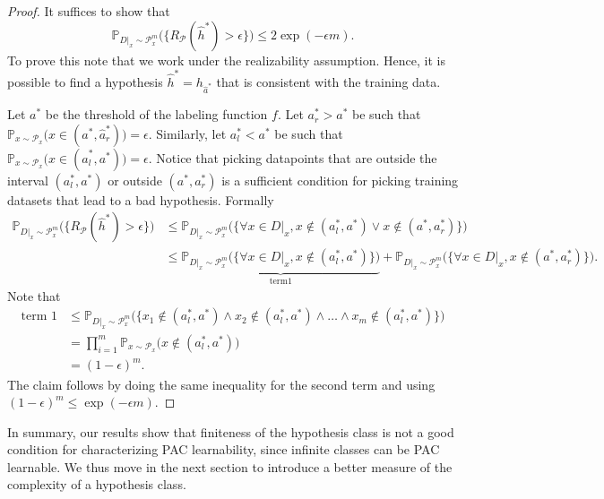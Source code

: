 \begin{proof}
	It suffices to show that 
	$$
	\mathbb{P}_{D|_x \sim \mathcal{P}^m_x} \bigl( \{ R_\mathcal{P}(\hat{h}^*) > \epsilon \}\bigr) \leq 2 \exp(-\epsilon m).
	$$
	To prove this note that we work under the realizability assumption. Hence,
	it is possible to find a hypothesis $\hat{h}^* = h_{\hat{a}^*}$ that is
	consistent with the training data. 
	
	Let $a^*$ be the threshold of the labeling function $f$. Let $a^* _r >a^*$ be such that $\mathbb{P}_{x \sim \mathcal{P}_x}\bigl(x \in (a^*,
	\hat{a}^*_r)\bigr)= \epsilon$. Similarly, let $a^*_l <a^*$ be such
	that $\mathbb{P}_{x \sim \mathcal{P}_x}\bigl(x \in (\hat{a}^*_l, a^*)\bigr)=
	\epsilon$. Notice that picking datapoints that are outside the interval
	$(a^*_l, a^*)$ or outside $(a^*, a^*_r)$ is a sufficient condition for picking training datasets that lead to a bad
	hypothesis. Formally
	\begin{align*} 
	\mathbb{P}_{D|_x \sim \mathcal{P}^m_x} \bigl( \{ R_\mathcal{P}(\hat{h}^*) > \epsilon \}\bigr) &\leq \mathbb{P}_{D|_x \sim \mathcal{P}^m_x} \bigl(\{\forall x \in D|_x,  x \notin (a^*_l, a^*) \vee x \notin (a^*, a^*_r)\}\bigr) \\
	&\leq \underbrace{\mathbb{P}_{D|_x \sim \mathcal{P}^m_x} \bigl(\{\forall x \in D|_x,  x \notin (a^*_l, a^*) \}\bigr)}_{\text{term} 1} + \mathbb{P}_{D|_x \sim \mathcal{P}^m_x} \bigl(\{\forall x \in D|_x,  x \notin (a^*, a^*_r)\}\bigr). 
	\end{align*}
	Note that 
	\begin{align*}
		\text{term }1 &\leq \mathbb{P}_{D|_x \sim \mathcal{P}^m_x} \bigl(\{x_1 \notin (a^*_l, a^*) \wedge x_2 \notin (a^*_l, a^*) \wedge \dots \wedge x_m \notin (a^*_l, a^*) \}\bigr)\\
		&= \prod_{i=1}^m \mathbb{P}_{x \sim \mathcal{P}_x} \bigl(x \notin (a^*_l, a^*)\bigr)\\
		&= (1-\epsilon)^m.
	\end{align*}
	The claim follows by doing the same inequality for the second term and using $(1-\epsilon)^m \leq \exp(-\epsilon m)$.
\end{proof}
In summary, our results show that finiteness of the hypothesis class is not a
good condition for characterizing PAC learnability, since infinite classes can
be PAC learnable. We thus move in the next section to introduce a better measure
of the complexity of a hypothesis class.

